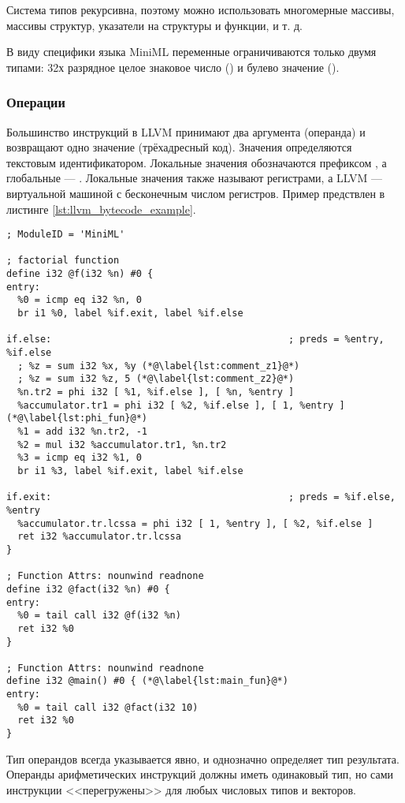 Система типов рекурсивна, поэтому можно использовать многомерные массивы, массивы структур, указатели на структуры и функции, и т.
д.

В виду специфики языка MiniML переменные ограничиваются
только двумя типами: 32х разрядное целое знаковое число () и
булево значение ().

\subsubsection{Операции}

Большинство инструкций в LLVM принимают два аргумента (операнда) и возвращают одно значение (трёхадресный код). Значения
определяются текстовым идентификатором. Локальные значения обозначаются префиксом \icode{\%}, а глобальные — . Локальные значения также
называют регистрами, а LLVM — виртуальной машиной с бесконечным числом регистров. Пример
предствлен в листинге \ref{lst:llvm_bytecode_example}.

\begin{lstlisting}[caption=Пример сгенерированного LLVM байткода
                  , label=lst:llvm_bytecode_example]
; ModuleID = 'MiniML'

; factorial function
define i32 @f(i32 %n) #0 {
entry:
  %0 = icmp eq i32 %n, 0
  br i1 %0, label %if.exit, label %if.else

if.else:                                          ; preds = %entry, %if.else
  ; %z = sum i32 %x, %y (*@\label{lst:comment_z1}@*)
  ; %z = sum i32 %z, 5 (*@\label{lst:comment_z2}@*)
  %n.tr2 = phi i32 [ %1, %if.else ], [ %n, %entry ]
  %accumulator.tr1 = phi i32 [ %2, %if.else ], [ 1, %entry ] (*@\label{lst:phi_fun}@*)
  %1 = add i32 %n.tr2, -1
  %2 = mul i32 %accumulator.tr1, %n.tr2
  %3 = icmp eq i32 %1, 0
  br i1 %3, label %if.exit, label %if.else

if.exit:                                          ; preds = %if.else, %entry
  %accumulator.tr.lcssa = phi i32 [ 1, %entry ], [ %2, %if.else ]
  ret i32 %accumulator.tr.lcssa
}

; Function Attrs: nounwind readnone
define i32 @fact(i32 %n) #0 {
entry:
  %0 = tail call i32 @f(i32 %n)
  ret i32 %0
}

; Function Attrs: nounwind readnone
define i32 @main() #0 { (*@\label{lst:main_fun}@*)
entry:
  %0 = tail call i32 @fact(i32 10)
  ret i32 %0
}
\end{lstlisting}

Тип операндов всегда указывается явно, и однозначно определяет тип результата.
Операнды арифметических инструкций должны иметь одинаковый тип, но сами инструкции <<перегружены>> для любых числовых типов и векторов.

